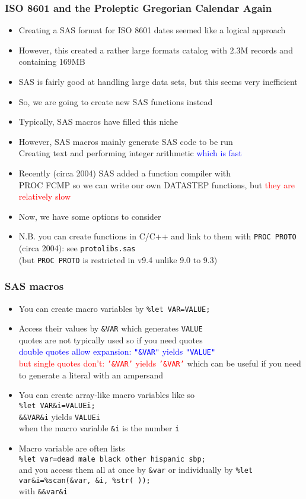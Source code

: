 \documentclass[11pt,pdftex,dvipsnames,usenames,helvetica]{beamer}
\begin{document}
\begin{frame}[fragile]
\frametitle{ISO 8601 and the Proleptic Gregorian Calendar Again}
\begin{itemize}
\item Creating a SAS format for ISO 8601 dates seemed like a logical
approach
\item However, this created a rather large formats catalog with 2.3M
records and containing 169MB
\item SAS is fairly good at handling large data sets, but this seems
very inefficient
\item So, we are going to create new SAS functions instead
\item Typically, SAS macros have filled this niche
\item However, SAS macros mainly generate SAS code to be run\\
Creating text and performing 
integer arithmetic \textcolor{blue}{which is fast}
\item Recently (circa 2004) SAS added a function compiler with\\
 PROC FCMP so we can write our own DATASTEP functions, 
but \textcolor{red}{they are relatively slow}
\item Now, we have some options to consider
\item N.B. you can create functions in C/C++ and
link to them with {\tt PROC PROTO} (circa 2004): see {\tt protolibs.sas}\\
(but {\tt PROC PROTO} is restricted in v9.4 unlike 9.0 to 9.3)
\end{itemize}
\end{frame}

\begin{frame}[fragile]
\frametitle{SAS macros}
\begin{itemize}
\item You can create macro variables by {\tt \%let VAR=VALUE;}
\item Access their values by {\tt \&VAR} 
which generates {\tt VALUE}\\
quotes are not typically used so if you need quotes\\
\textcolor{blue}{double quotes allow expansion: {\tt "\&VAR"} yields {\tt "VALUE"}}\\
\textcolor{red}{but single quotes don't: {\tt '\&VAR'} yields {\tt '\&VAR'}}
which can be useful if you need to generate a literal with an ampersand
\item You can create array-like macro variables like so\\
{\tt \%let VAR\&i=VALUEi;}\\
{\tt \&\&VAR\&i} yields {\tt VALUEi}\\
 when the macro variable {\tt \&i} is the number {\tt i}
\item Macro variable are often lists\\
{\tt \%let var=dead male black other hispanic sbp;}\\
and you access them all at once by {\tt \&var} or individually by
{\tt \%let var\&i=\%scan(\&var, \&i, \%str( ));}\\
with {\tt \&\&var\&i}
\end{itemize}
\end{frame}
\end{document}
